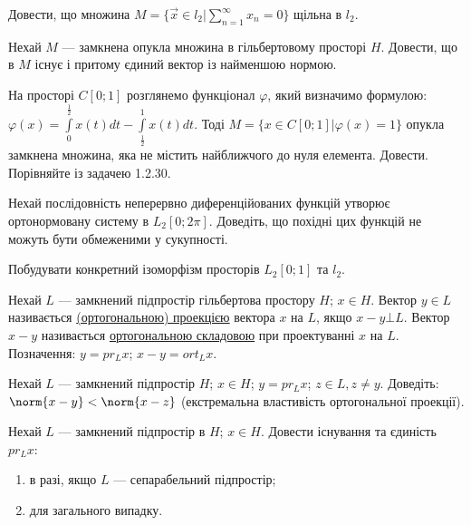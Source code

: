
\begin{exercise}
    Довести, що множина $M = \{ \vec{x} \in l_2 | \sum\limits_{n = 1}^{\infty}x_n = 0\}$
    щільна в $l_2$.
\end{exercise}

\begin{exercise}
    Нехай $M$ --- замкнена опукла множина в гільбертовому просторі $H$. Довести, що в $M$
    існує і притому єдиний вектор із найменшою нормою.
\end{exercise}

\begin{exercise}
    На просторі $C[0;1]$ розглянемо функціонал $\varphi$, який визначимо формулою: 
    $\varphi(x) = \int\limits_{0}^{\frac{1}{2}}x(t)dt - \int\limits_{\frac{1}{2}}^{1}x(t)dt$. Тоді
    $M = \{x \in C[0; 1] | \varphi(x) = 1\}$ опукла замкнена множина, яка не містить найближчого до 
    нуля елемента. Довести. Порівняйте із задачею 1.2.30.
\end{exercise}

\begin{exercise}
    Нехай послідовність неперервно диференційованих функцій утворює ортонормовану систему
    в $L_2[0; 2\pi]$. Доведіть, що похідні цих функцій не можуть бути обмеженими у сукупності.
\end{exercise}

\begin{exercise}
    Побудувати конкретний ізоморфізм просторів $L_2[0;1]$ та $l_2$.
\end{exercise}

\begin{theory}
    Нехай $L$ --- замкнений підпростір гільбертова простору $H$; $x \in H$. Вектор
    $y \in L$ називається \underline{(ортогональною) проекцією} вектора $x$ на $L$, якщо
    $x - y \bot L$. Вектор $x - y$ називається \underline{ортогональною складовою} при
    проектуванні $x$ на $L$. Позначення: $y = pr_L x$; $x - y = ort_L x$.
\end{theory}

\begin{exercise}
    Нехай $L$ --- замкнений підпростір $H$; $x \in H$; $y = pr_L x$; $z \in L, z \neq y$.
    Доведіть: $\norm{x - y} < \norm{x - z}$ (екстремальна властивість ортогональної проекції).
\end{exercise}

\begin{exercise}
    Нехай $L$ --- замкнений підпростір в $H$; $x \in H$. Довести існування та єдиність $pr_L x$:
    \begin{enumerate}[\label = \ukr*)]
        \item в разі, якщо $L$ --- сепарабельний підпростір;
        \item для загального випадку.
    \end{enumerate}
\end{exercise}

